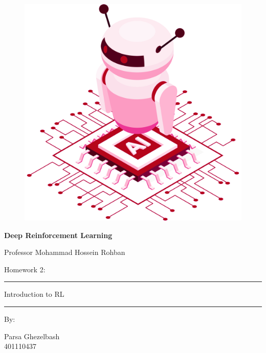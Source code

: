 \documentclass[12pt]{article}
\begin{document}
\thispagestyle{plain}

\begin{center}

\vspace*{-1.5cm}
\begin{figure}[!h]
    \centering
    \includegraphics[width=0.7\linewidth]{figs/cover-std.png}
\end{figure}

{

{\color{DarkBlue} {\fontsize{30}{50} \textbf{
Deep Reinforcement Learning
}}}

{\color{DarkBlue} {\Large
Professor Mohammad Hossein Rohban
}}
}


\vspace{20pt}

{


{\color{RedOrange}
{\Large
Homework 2:
}\\
}
{\color{BrickRed}
\rule{12cm}{0.5pt}

{\Huge
Introduction to RL
}
\rule{12cm}{0.5pt}
}

\vspace{10pt}

{\color{RoyalPurple} { \small By:} } \\
\vspace{10pt}

{\color{Blue} { \LARGE Parsa Ghezelbash } } \\
\vspace{5pt}
{\color{RoyalBlue} { \Large 401110437 } }


}
\end{center}
\end{document}

